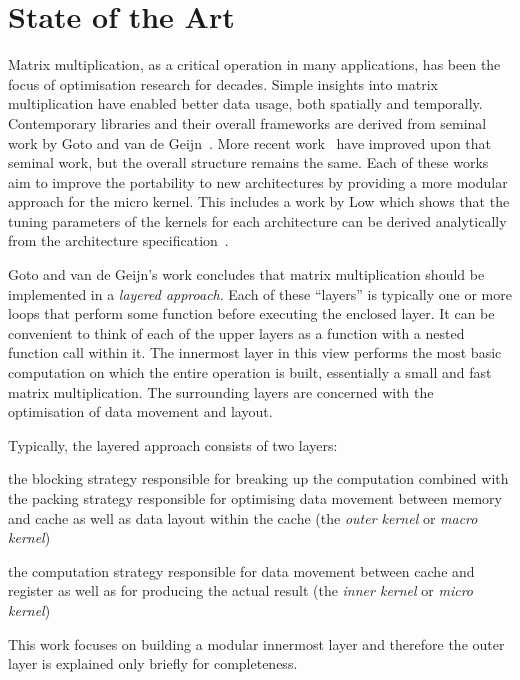\documentclass[\main/thesis.tex]{subfiles}
\begin{document}
\section{State of the Art}
Matrix multiplication, as a critical operation in many applications, has been the focus of optimisation research for decades.
Simple insights into matrix multiplication have enabled better data usage, both spatially and temporally.
Contemporary libraries and their overall frameworks are derived from seminal work by Goto and van de Geijn~\autocite{goto2008anatomy}.
More recent work~\autocite{vanzee2015blis,zee2016blis} have improved upon that seminal work, but the overall structure remains the same.
Each of these works aim to improve the portability to new architectures by providing a more modular approach for the micro kernel.
This includes a work by Low \etal which shows that the tuning parameters of the kernels for each architecture can be derived analytically from the architecture specification~\autocite{low2016analytical}.

Goto and van de Geijn's work concludes that matrix multiplication should be implemented in a \emph{layered approach}.
Each of these ``layers'' is typically one or more loops that perform some function before executing the enclosed layer.
It can be convenient to think of each of the upper layers as a function with a nested function call within it.
The innermost layer in this view performs the most basic computation on which the entire operation is built, essentially a small and fast matrix multiplication.
The surrounding layers are concerned with the optimisation of data movement and layout.

Typically, the layered approach consists of two layers:
\begin{enumerate*}[itemjoin={{; }}, itemjoin*={{; and }}, label=\textbf{(\arabic*)}, after={.}]
  \item the blocking strategy responsible for breaking up the computation combined with the packing strategy responsible for optimising data movement between memory and cache as well as data layout within the cache (the \emph{outer kernel} or \emph{macro kernel})
  \item the computation strategy responsible for data movement between cache and register as well as for producing the actual result (the \emph{inner kernel} or \emph{micro kernel})
\end{enumerate*}
This work focuses on building a modular innermost layer and therefore the outer layer is explained only briefly for completeness.
\end{document}
